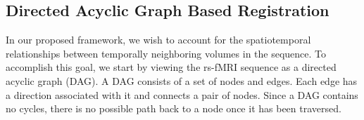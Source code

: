 


\subsection{Directed Acyclic Graph Based Registration}

In our proposed framework, we wish to account for the spatiotemporal relationships between temporally neighboring volumes in the sequence. To accomplish this goal, we start by viewing the rs-fMRI sequence as a directed acyclic graph (DAG). A DAG consists of a set of nodes and edges. Each edge has a direction associated with it and connects a pair of nodes. Since a DAG contains no cycles, there is no possible path back to a node once it has been traversed. 

